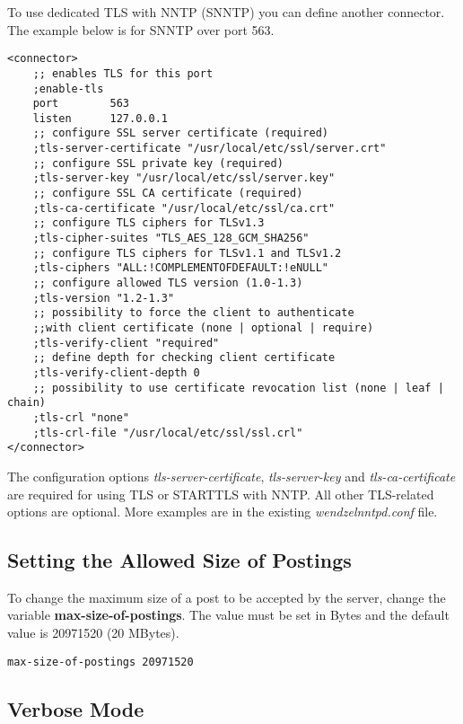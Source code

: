 \documentclass[12pt,fleqn,leqno]{scrbook}
\begin{document}
To use dedicated TLS with NNTP (SNNTP) you can define another connector.
The example below is for SNNTP over port 563.

\begin{verbatim}
<connector>
    ;; enables TLS for this port
    ;enable-tls
    port        563
    listen      127.0.0.1
    ;; configure SSL server certificate (required)
    ;tls-server-certificate "/usr/local/etc/ssl/server.crt"
    ;; configure SSL private key (required)
    ;tls-server-key "/usr/local/etc/ssl/server.key"
    ;; configure SSL CA certificate (required)
    ;tls-ca-certificate "/usr/local/etc/ssl/ca.crt"
    ;; configure TLS ciphers for TLSv1.3
    ;tls-cipher-suites "TLS_AES_128_GCM_SHA256"
    ;; configure TLS ciphers for TLSv1.1 and TLSv1.2
    ;tls-ciphers "ALL:!COMPLEMENTOFDEFAULT:!eNULL"
    ;; configure allowed TLS version (1.0-1.3)
    ;tls-version "1.2-1.3"
    ;; possibility to force the client to authenticate 
    ;;with client certificate (none | optional | require)
    ;tls-verify-client "required"
    ;; define depth for checking client certificate
    ;tls-verify-client-depth 0
    ;; possibility to use certificate revocation list (none | leaf | chain)
    ;tls-crl "none"
    ;tls-crl-file "/usr/local/etc/ssl/ssl.crl"
</connector>
\end{verbatim}

The configuration options \emph{tls-server-certificate},
\emph{tls-server-key} and \emph{tls-ca-certificate} are required for
using TLS or STARTTLS with NNTP. All other TLS-related options are
optional. More examples are in the existing \emph{wendzelnntpd.conf}
file.

\hypertarget{setting-the-allowed-size-of-postings}{%
\subsection{Setting the Allowed Size of
Postings}\label{setting-the-allowed-size-of-postings}}

To change the maximum size of a post to be accepted by the server,
change the variable \textbf{max-size-of-postings}. The value must be set
in Bytes and the default value is 20971520 (20 MBytes).

\begin{verbatim}
max-size-of-postings 20971520
\end{verbatim}

\hypertarget{verbose-mode}{%
\subsection{Verbose Mode}\label{verbose-mode}}
\end{document}
